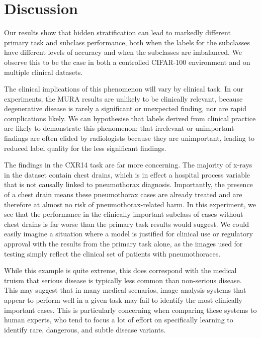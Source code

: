 \documentclass{article}
\begin{document}
\section{Discussion}

Our results show that hidden stratification can lead to markedly different primary task and subclass performance, both when the labels for the subclasses have different levels of accuracy and when the subclasses are imbalanced.  
We observe this to be the case in both a controlled CIFAR-100 environment and on multiple clinical datasets.

The clinical implications of this phenomenon will vary by clinical task. In our experiments, the MURA results are unlikely to be clinically relevant, because degenerative disease is rarely a significant or unexpected finding, nor are rapid complications likely. 
We can hypothesise that labels derived from clinical practice are likely to demonstrate this phenomenon; that irrelevant or unimportant findings are often elided by radiologists because they are unimportant, leading to reduced label quality for the less significant findings.

The findings in the CXR14 task are far more concerning. 
The majority of x-rays in the dataset contain chest drains, which is in effect a hospital process variable that is not causally linked to pneumothorax diagnosis.
 Importantly, the presence of a chest drain means these pneumothorax cases are already treated and are therefore at almost no risk of pneumothorax-related harm. 
 In this experiment, we see that the performance in the clinically important subclass of cases without chest drains is far worse than the primary task results would suggest. 
 We could easily imagine a situation where a model is justified for clinical use or regulatory approval with the results from the primary task alone, as the images used for testing simply reflect the clinical set of patients with pneumothoraces.
 
While this example is quite extreme, this does correspond with the medical truism that serious disease is typically less common than non-serious disease. 
This may suggest that in many medical scenarios, image analysis systems that appear to perform well in a given task may fail to identify the most clinically important cases. 
This is particularly concerning when comparing these systems to human experts, who tend to focus a lot of effort on specifically learning to identify rare, dangerous, and subtle disease variants.
\end{document}

